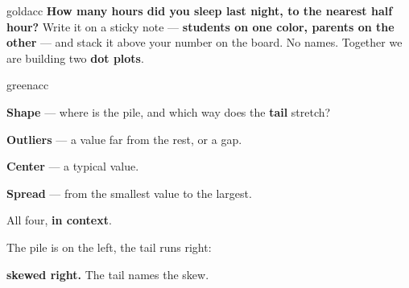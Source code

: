 \documentclass[12pt]{article}
\begin{document}

\boxguard
\begin{scenariobox}{goldacc}
\textbf{How many hours did you sleep last night, to the nearest half hour?} Write it on a
sticky note --- \textbf{students on one color, parents on the other} --- and stack it above
your number on the board. No names. Together we are building two \textbf{dot plots}.
\end{scenariobox}

\vspace{0.08in}
\boxguard[30]
\begin{scenariobox}{greenacc}
\begin{minipage}[t]{0.55\linewidth}\vspace{0pt}\raggedright
\textbf{Shape} --- where is the pile, and which way does the \textbf{tail} stretch?\par\vspace{3pt}
\textbf{Outliers} --- a value far from the rest, or a gap.\par\vspace{3pt}
\textbf{Center} --- a typical value.\par\vspace{3pt}
\textbf{Spread} --- from the smallest value to the largest.\par\vspace{3pt}
All four, \textbf{in context}.
\end{minipage}\hfill
\begin{minipage}[t]{0.42\linewidth}\vspace{0pt}\centering
{}\par\vspace{2pt}
{\small The pile is on the left, the tail runs right:\par
\textbf{skewed right.} The tail names the skew.}
\end{minipage}
\end{scenariobox}
\end{document}
